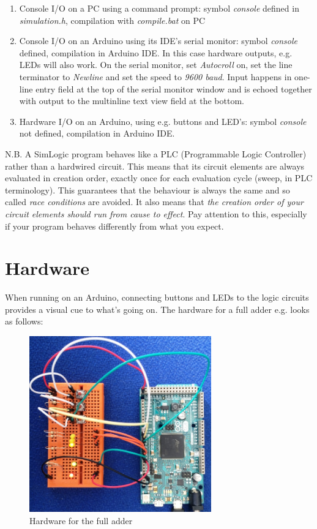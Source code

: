 \documentclass[a4paper,11pt]{article}
\begin{document}
\begin{enumerate}
\item{Console I/O on a PC using a command prompt: symbol \emph{console} defined in \emph{simulation.h}, compilation with \emph{compile.bat} on PC}
\item{Console I/O on an Arduino using its IDE's serial monitor: symbol \emph{console} defined, compilation in Arduino IDE. In this case hardware outputs, e.g. LEDs will also work. On the serial monitor, set \emph{Autocroll} on, set the line terminator to \emph{Newline} and set the speed to \emph{9600 baud}. Input happens in one-line entry field at the top of the serial monitor window and is echoed together with output to the multinline text view field at the bottom.}
\item{Hardware I/O on an Arduino, using e.g. buttons and LED's: symbol \emph{console} not defined, compilation in Arduino IDE.}
\end{enumerate}

N.B. A SimLogic program behaves like a PLC (Programmable Logic Controller) rather than a hardwired circuit. This means that its circuit elements are always evaluated in creation order, exactly once for each evaluation cycle (sweep, in PLC terminology). This guarantees that the behaviour is always the same and so called \emph{race conditions} are avoided. It also means that \emph{the creation order of your circuit elements should run from cause to effect}. Pay attention to this, especially if your program behaves differently from what you expect.

\section{Hardware}

When running on an Arduino, connecting buttons and LEDs to the logic circuits provides a visual cue to what's going on.
The hardware for a full adder e.g. looks as follows:

\begin{figure}[H]
\centering
\includegraphics[width=0.7\textwidth]{full_adder.jpg}
\caption{Hardware for the full adder}
\end{figure}
\end{document}
